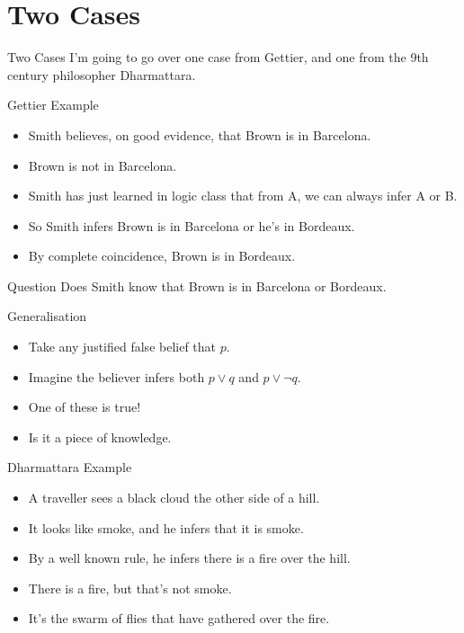 \documentclass[
  17pt,
  letterpaper,
  ignorenonframetext,
  aspectratio=169,
  handout]{beamer}
\providecommand{\tightlist}{%
  \setlength{\itemsep}{0pt}\setlength{\parskip}{0pt}}\usepackage{longtable,booktabs,array}
\begin{document}
\hypertarget{two-cases}{%
\section{Two Cases}\label{two-cases}}

\begin{frame}{Two Cases}
\protect\hypertarget{two-cases-1}{}
I'm going to go over one case from Gettier, and one from the 9th century
philosopher Dharmattara.
\end{frame}

\begin{frame}{Gettier Example}
\protect\hypertarget{gettier-example}{}
\begin{itemize}[<+->]
\tightlist
\item
  Smith believes, on good evidence, that Brown is in Barcelona.
\item
  Brown is not in Barcelona.
\item
  Smith has just learned in logic class that from A, we can always infer
  A or B.
\item
  So Smith infers Brown is in Barcelona or he's in Bordeaux.
\item
  By complete coincidence, Brown is in Bordeaux.
\end{itemize}
\end{frame}

\begin{frame}{Question}
\protect\hypertarget{question}{}
Does Smith know that Brown is in Barcelona or Bordeaux.
\end{frame}

\begin{frame}{Generalisation}
\protect\hypertarget{generalisation}{}
\begin{itemize}[<+->]
\tightlist
\item
  Take any justified false belief that \(p\).
\item
  Imagine the believer infers both \(p \vee q\) and \(p \vee \neg q\).
\item
  One of these is true!
\item
  Is it a piece of knowledge.
\end{itemize}
\end{frame}

\begin{frame}{Dharmattara Example}
\protect\hypertarget{dharmattara-example}{}
\begin{itemize}[<+->]
\tightlist
\item
  A traveller sees a black cloud the other side of a hill.
\item
  It looks like smoke, and he infers that it is smoke.
\item
  By a well known rule, he infers there is a fire over the hill.
\item
  There is a fire, but that's not smoke.
\item
  It's the swarm of flies that have gathered over the fire.
\end{itemize}
\end{frame}
\end{document}
